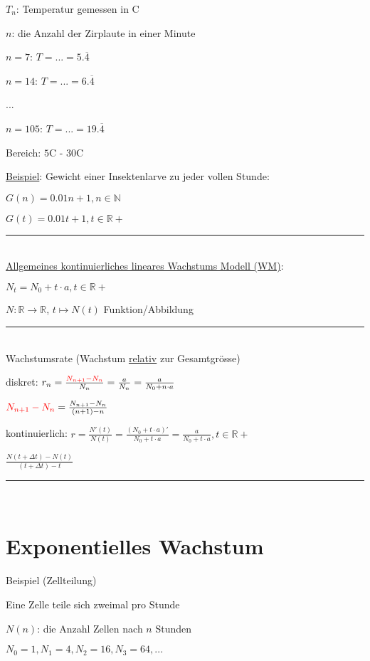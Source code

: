 \documentclass[18pt,a4paper]{scrreprt}
\begin{document}
$T_n$: Temperatur gemessen in \textdegree C

$n$: die Anzahl der Zirplaute in einer Minute

$n = 7$: $T = ... = 5.\overline{4}$ 

$n = 14$: $T = ... = 6.\overline{4}$

...

$n = 105$: $T = ... = 19.\overline{4}$

Bereich: $5$\textdegree C - $30$\textdegree C

\uline{Beispiel}: Gewicht einer Insektenlarve zu jeder vollen Stunde:

$G(n) = 0.01n + 1, n \in \mathbb{N}$

$G(t) = 0.01t + 1, t \in \mathbb{R+}$

\rule{\textwidth}{0.4mm}\\

\uline{Allgemeines kontinuierliches lineares Wachstums Modell (WM)}:

$N_t = N_0 + t \cdot a, t \in \mathbb{R+}$

$N: \mathbb{R} \rightarrow \mathbb{R}$, $t \mapsto N(t)$ Funktion/Abbildung

\rule{\textwidth}{0.4mm}\\

Wachstumsrate (Wachstum \uline{relativ} zur Gesamtgrösse)

diskret: $r_n = \frac{\textcolor{red}{N_{n+1} - N_n}}{N_n} = \frac{a}{N_n} = \frac{a}{N_0 + n \cdot a}$

$\textcolor{red}{N_{n+1} - N_n} = \frac{N_{n+1} - N_n}{(n+1) - n}$

kontinuierlich: $r = \frac{N'(t)}{N(t)} = \frac{(N_0 + t \cdot a)'}{N_0 + t \cdot a} = \frac{a}{N_0 + t \cdot a}, t \in \mathbb{R+}$

$\frac{N(t + \Delta t) - N(t)}{(t + \Delta t) - t}$

\rule{\textwidth}{0.4mm}\\

\section{Exponentielles Wachstum}

Beispiel (Zellteilung)

Eine Zelle teile sich zweimal pro Stunde

$N(n)$: die Anzahl Zellen nach $n$ Stunden

$N_0 = 1, N_1 = 4, N_2 = 16, N_3 = 64, ...$
\end{document}

